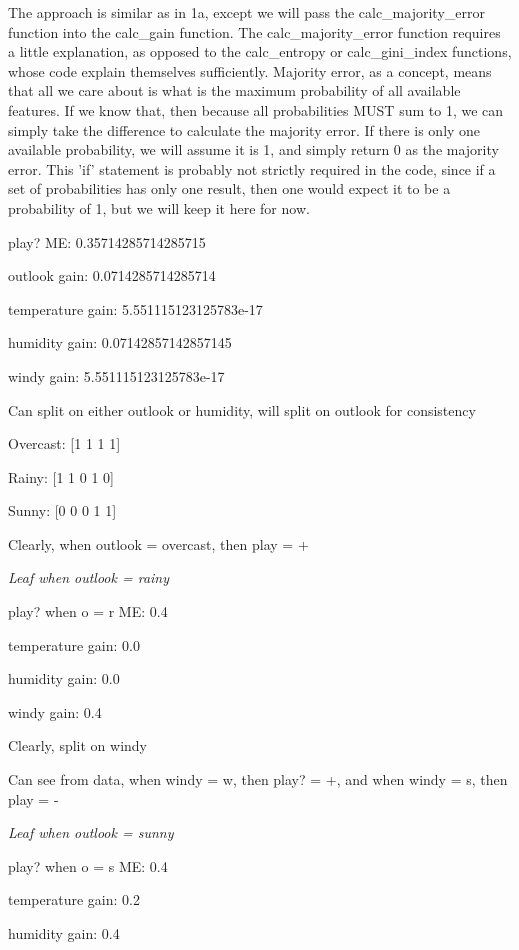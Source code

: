 \documentclass[12pt, fullpage,letterpaper]{article}
\begin{document}
\begin{enumerate}
\begin{enumerate}
	The approach is similar as in 1a, except we will pass the calc\_majority\_error function into the calc\_gain function. The calc\_majority\_error function requires a little explanation, as opposed to the calc\_entropy or calc\_gini\_index functions, whose code explain themselves sufficiently. Majority error, as a concept, means that all we care about is what is the maximum probability of all available features. If we know that, then because all probabilities MUST sum to 1, we can simply take the difference to calculate the majority error. If there is only one available probability, we will assume it is 1, and simply return 0 as the majority error. This 'if' statement is probably not strictly required in the code, since if a set of probabilities has only one result, then one would expect it to be a probability of 1, but we will keep it here for now.
	
	play? ME:  0.35714285714285715
	
    outlook gain: 0.0714285714285714
    
    temperature gain: 5.551115123125783e-17
    
    humidity gain: 0.07142857142857145
    
    windy gain: 5.551115123125783e-17
    
    Can split on either outlook or humidity, will split on outlook for consistency
    
    Overcast: [1 1 1 1]
    
    Rainy: [1 1 0 1 0]
    
    Sunny: [0 0 0 1 1]
    
    Clearly, when outlook = overcast, then play = +
    
    \hline
    \emph{Leaf when outlook = rainy}
    
    play? when o = r ME:  0.4
    
    temperature gain: 0.0
    
    humidity gain: 0.0
    
    windy gain: 0.4
    
    Clearly, split on windy

    Can see from data, when windy = w, then play? = +, and when windy = s, then play = -
    
    \hline
    \emph{Leaf when outlook = sunny}
    
    play? when o = s ME:  0.4
    
    temperature gain: 0.2
    
    humidity gain: 0.4
    

\end{enumerate}
\end{enumerate}
\end{document}
